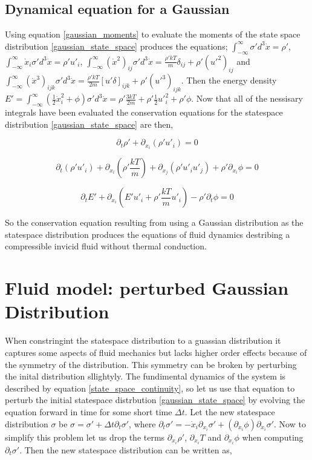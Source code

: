 \documentclass[%
 twocolumn,
 preprint, onecolumn,
 amsmath,amssymb,
 aps,
]{revtex4-1}
\newcommand{\intVdot}[1]{\int_{-\infty}^{\infty} #1 d^3\dot{x}}
\begin{document}
\subsection{Dynamical equation for a Gaussian}
Using equation \eqref{gaussian_moments} to evaluate the moments of the state space distribution \eqref{gaussian_state_space} produces the equations; $\intVdot{\sigma'}=\rho'$, $\intVdot{\dot{x}_i\sigma'}=\rho' u'_i$, $\intVdot{\left(\dot{x}^2\right)_{ij}\sigma'}=\frac{\rho'kT}{m}\delta_{ij} + \rho'\left(u'^2\right)_{ij}$ and $\intVdot{\left(\dot{x}^3\right)_{ijk}\sigma'}=\frac{\rho'kT}{2m}\left[u'\delta\right]_{ijk} + \rho'\left(u'^3\right)_{ijk}$. Then the energy density $E'=\intVdot{\left(\frac{1}{2}\dot{x}_i^2 + \phi\right)\sigma'}=\rho'\frac{3kT}{2m}+\rho'\frac{1}{2}{u'}_i^2+\rho'\phi$. Now that all of the nessisary integrals have been evaluated the conservation equations for the statespace distribution \eqref{gaussian_state_space} are then,

\[
\partial_t \rho' + \partial_{x_i}\left(\rho'u'_i\right)=0
\]

\[
\partial_t \left(\rho' u'_i\right) + \partial_{x_i}\left(\rho'\frac{kT}{m}\right) + \partial_{x_j}\left(\rho'u'_iu'_j\right) + \rho'\partial_{x_i}\phi = 0
\]

\[
\partial_t E' + \partial_{x_i}\left(E'u'_i + \rho'\frac{kT}{m}u'_i\right)-\rho'\partial_t\phi = 0
\]

So the conservation equation resulting from using a Gaussian distribution as the statespace distribution produces the equations of fluid dynamics destribing a compressible invicid fluid without thermal conduction.

\section{Fluid model: perturbed Gaussian Distribution}
When constringint the statespace distribution to a guassian distribution it captures some aspects of fluid mechanics but lacks higher order effects because of the symmetry of the distribution. This symmetry can be broken by perturbing the inital distribution sllightyly. The fundimental dynamics of the system is described by equation \eqref{state_space_continuity}, so let us use that equation to perturb the initial statespace distrbution \eqref{gaussian_state_space} by evolving the equation forward in time for some short time $\Delta t$. Let the new statespace distribution $\sigma$ be $\sigma=\sigma' + \Delta t\partial_t \sigma'$, where $\partial_t \sigma'=-\dot{x}_i\partial_{x_i}\sigma'+\left(\partial_{x_i}\phi\right)\partial_{\dot{x}_i}\sigma'$. Now to simplify this problem let us drop the terms $\partial_{x_i}\rho'$, $\partial_{x_i}T$ and $\partial_{x_i}\phi$ when computing $\partial_t \sigma'$. Then the new statespace distribution can be written as,
\end{document}
